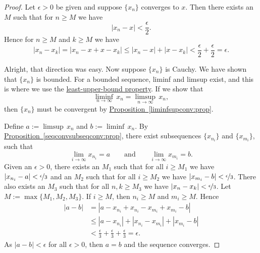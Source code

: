 \documentclass[12pt]{book}
\newcommand{\abs}[1]{\left\lvert {#1} \right\rvert}
\theoremstyle{plain}
\theoremstyle{remark}
\theoremstyle{definition}
\theoremstyle{exercise}
\theoremstyle{example}
\newcommand{\propref}[1]{\hyperref[#1]{Proposition~\ref*{#1}}}
\begin{document}
\begin{proof}
Let $\epsilon > 0$ be given and
suppose $\{ x_n \}$ converges to $x$.  Then there 
exists an $M$ such that for $n \geq M$ we have
\begin{equation*}
\abs{x_n - x} < \frac{\epsilon}{2} .
\end{equation*}
Hence for $n \geq M$ and $k \geq M$ we have
\begin{equation*}
\abs{x_n - x_k} = 
\abs{x_n - x + x - x_k}
\leq \abs{x_n-x} + \abs{x-x_k} < \frac{\epsilon}{2} + \frac{\epsilon}{2} =
\epsilon .
\end{equation*}

Alright, that direction was easy.  Now suppose $\{ x_n \}$ is Cauchy.
We have shown that $\{ x_n \}$ is bounded.
For a bounded sequence, liminf and limsup exist, and this is
where we use the
\hyperref[defn:lub]{least-upper-bound property}.
If we show that
\begin{equation*}
\liminf_{n\to \infty} \, x_n = \limsup_{n\to\infty} \, x_n ,
\end{equation*}
then $\{ x_n \}$ must be convergent by \propref{liminfsupconv:prop}.


Define $a := \limsup \, x_n$ and
$b := \liminf \, x_n$.
By \propref{seqconvsubseqconv:prop}, there exist subsequences
$\{ x_{n_i} \}$ and
$\{ x_{m_i} \}$, such that
\begin{equation*}
\lim_{i\to\infty} x_{n_i} = a
\qquad \text{and} \qquad
\lim_{i\to\infty} x_{m_i} = b.
\end{equation*}
Given an $\epsilon > 0$,
there exists an $M_1$ such that for all $i \geq M_1$
we have $\abs{x_{n_i} - a} < \nicefrac{\epsilon}{3}$ and
an $M_2$ such that for all $i \geq M_2$ we have
$\abs{x_{m_i} - b} < \nicefrac{\epsilon}{3}$.  There also exists an $M_3$
such that for all $n,k \geq M_3$ we have
$\abs{x_n-x_k} < \nicefrac{\epsilon}{3}$.  Let $M := \max \{ M_1, M_2, M_3 \}$.
If $i \geq M$, then $n_i \geq M$ and $m_i \geq M$.  Hence
\begin{equation*}
\begin{split}
\abs{a-b} & =
\abs{a-x_{n_i}+x_{n_i}
-x_{m_i}+x_{m_i}
-b} \\
& \leq
\abs{a-x_{n_i}}
+ \abs{x_{n_i} -x_{m_i}}
+ \abs{x_{m_i} -b} \\
& <
\frac{\epsilon}{3}
+
\frac{\epsilon}{3}
+
\frac{\epsilon}{3}
= \epsilon .
\end{split}
\end{equation*}
As $\abs{a-b} < \epsilon$ for all $\epsilon > 0$, then $a=b$ and 
the sequence converges.
\end{proof}
\end{document}
